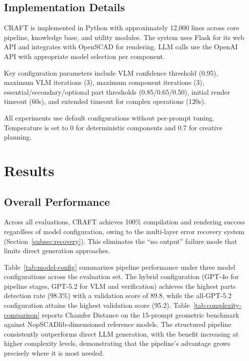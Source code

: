 \documentclass[5p,twocolumn,10pt,times]{elsarticle}
\begin{document}
\subsection{Implementation Details}

CRAFT is implemented in Python with approximately 12,000 lines across core pipeline, knowledge base, and utility modules. The system uses Flask for its web API and integrates with OpenSCAD for rendering. LLM calls use the OpenAI API with appropriate model selection per component.

Key configuration parameters include VLM confidence threshold (0.95), maximum VLM iterations (3), maximum component iterations (3), essential/secondary/optional part thresholds (0.85/0.65/0.50), initial render timeout (60s), and extended timeout for complex operations (120s).

All experiments use default configurations without per-prompt tuning. Temperature is set to 0 for deterministic components and 0.7 for creative planning.



\section{Results}
\label{sec:results}
\subsection{Overall Performance}

Across all evaluations, CRAFT achieves 100\% compilation and rendering success regardless of model configuration, owing to the multi-layer error recovery system (Section~\ref{subsec:recovery}). This eliminates the ``no output'' failure mode that limits direct generation approaches.

Table~\ref{tab:model-config} summarizes pipeline performance under three model configurations across the evaluation set. The hybrid configuration (GPT-4o for pipeline stages, GPT-5.2 for VLM and verification) achieves the highest parts detection rate (98.3\%) with a validation score of 89.8, while the all-GPT-5.2 configuration attains the highest validation score (95.2). Table~\ref{tab:complexity-comparison} reports Chamfer Distance on the 15-prompt geometric benchmark against NopSCADlib-dimensioned reference models. The structured pipeline consistently outperforms direct LLM generation, with the benefit increasing at higher complexity levels, demonstrating that the pipeline's advantage grows precisely where it is most needed.
\end{document}
